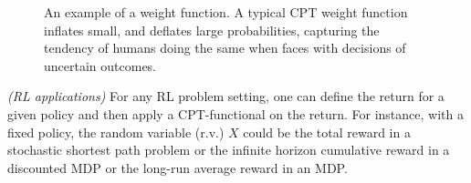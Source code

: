 \begin{figure}[t]
\centering
{}
\caption{An example of a weight function.
A typical CPT weight function inflates small, and deflates large probabilities, capturing the 
tendency of humans doing the same when faces with decisions of uncertain outcomes.
}
\label{fig:w}
\end{figure}

\begin{remark}\textit{(RL applications)}
For any RL problem setting, one can define the return for a given policy and then apply a CPT-functional on the return. For instance, with a fixed policy, the random variable (r.v.) $X$ could be the total reward in a stochastic shortest path problem or the infinite horizon cumulative reward in a discounted MDP or the long-run average reward in an MDP.
\end{remark}


